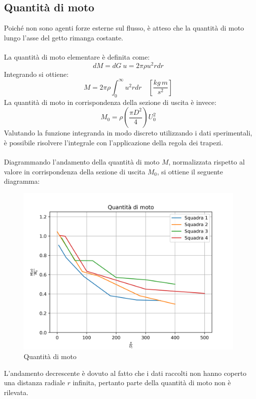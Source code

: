 \subsection{Quantità di moto}
Poiché non sono agenti forze esterne sul flusso, è atteso che la quantità di moto lungo l'asse del getto rimanga costante.\\\\
La quantità di moto elementare è definita come:
\begin{equation*}
    dM = dG\ u = 2\pi\rho u^2 rdr
\end{equation*}
Integrando si ottiene:
\begin{equation*}
    M = 2\pi\rho \int_0^\infty u^2r dr \quad \left[\frac{kg\,m}{s^2} \right]
\end{equation*}
La quantità di moto in corrispondenza della sezione di uscita è invece:
\begin{equation*}
    M_0 = \rho \left( \frac{\pi D^2}4 \right) U_0^2
\end{equation*}
Valutando la funzione integranda in modo discreto utilizzando i dati sperimentali, è possibile risolvere l'integrale con l'applicazione della regola dei trapezi.\\\\
Diagrammando l'andamento della quantità di moto $M$, normalizzata rispetto al valore in corrispondenza della sezione di uscita $M_0$, si ottiene il seguente diagramma:
\begin{figure}[h]
    \centering
    \includegraphics[width=.7\linewidth]{images/4/qdm.png}
    \caption{Quantità di moto}
\end{figure}

\noindent L'andamento decrescente è dovuto al fatto che i dati raccolti non hanno coperto una distanza radiale $r$ infinita, pertanto parte della quantità di moto non è rilevata.

